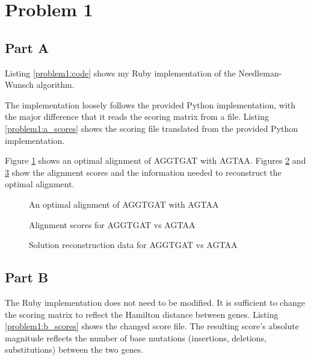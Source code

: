 \section{Problem 1}

\subsection{Part A}
Listing \ref{problem1:code} shows my Ruby implementation of the Needleman-Wunsch
algorithm. 



The implementation loosely follows the provided Python implementation, with the
major difference that it reads the scoring matrix from a file. Listing
\ref{problem1:a_scores} shows the scoring file translated from the provided
Python implementation.



Figure \ref{problem1:solution} shows an optimal alignment of AGGTGAT with
AGTAA. Figures \ref{problem1:scores} and \ref{problem1:parents} show the
alignment scores and the information needed to reconstruct the optimal
alignment.

\begin{figure}[hbp]
\center 
\caption{An optimal alignment of AGGTGAT with AGTAA}
\label{problem1:solution}
\end{figure}

\begin{figure}[hbp]
\center 
\caption{Alignment scores for AGGTGAT vs AGTAA}
\label{problem1:scores}
\end{figure}

\begin{figure}[hbp]
\center 
\caption{Solution reconstruction data  for AGGTGAT vs AGTAA}
\label{problem1:parents}
\end{figure}

\subsection{Part B}
The Ruby implementation does not need to be modified. It is sufficient to
change the scoring matrix to reflect the Hamilton distance between genes.
Listing \ref{problem1:b_scores} shows the changed score file. The resulting
score's absolute magnitude reflects the number of base mutations (insertions,
deletions, substitutions) between the two genes. 

